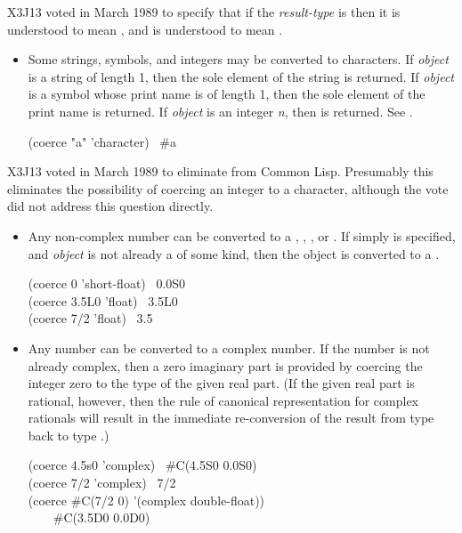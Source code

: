 \begin{defun}[Function]
\begin{newer}
X3J13 voted in March 1989 
to specify that if the {\it result-type} is 
then it is understood to mean ,
and  is understood to mean .
\end{newer}

\begin{obsolete}
\begin{itemize}
\item
Some strings, symbols, and integers may be converted to characters.
If {\it object} is a string of length 1, then the
sole element of the string is returned.  If {\it object} is a symbol
whose print name is of length 1, then the sole element of the print name
is returned.  If {\it object} is an integer {\it n}, then 
is returned.  See .
\begin{lisp}
(coerce "a" 'character) \EV\ \#{\Xbackslash}a
\end{lisp}
\end{itemize}
\end{obsolete}

\begin{newer}
X3J13 voted in March 1989 
to eliminate  from Common Lisp.
Presumably this eliminates the possibility of coercing an
integer to a character, although the vote did not address
this question directly.
\end{newer}

\begin{itemize}
\item
Any non-complex number can be converted to a ,
, , or .  If simply 
is specified, and {\it object} is not already a  of some kind, then
the object is converted to a .
\begin{lisp}
(coerce 0 'short-float) \EV\ 0.0S0 \\
(coerce 3.5L0 'float) \EV\ 3.5L0 \\
(coerce 7/2 'float) \EV\ 3.5
\end{lisp}

\item
Any number can be converted to a complex number.
If the number is not already complex, then a zero imaginary part
is provided by coercing the integer zero to the type of the given real part.
(If the given real part is rational, however, then the rule of
canonical representation for complex rationals will result
in the immediate re-conversion of the result from type 
back to type .)
\begin{lisp}
(coerce 4.5s0 'complex) \EV\ \#C(4.5S0 0.0S0) \\
(coerce 7/2 'complex) \EV\ 7/2 \\
(coerce \#C(7/2 0) '(complex double-float)) \\
~~~\EV\ \#C(3.5D0 0.0D0)
\end{lisp}


\end{itemize}
\end{defun}

